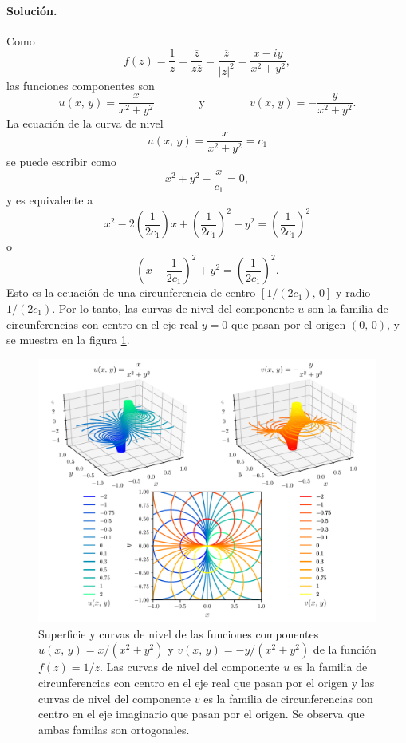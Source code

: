 \documentclass[a4paper]{report}
\begin{document}
\paragraph{Solución.} Como
\[
 f(z)=\frac{1}{z}=\frac{\overline{z}}{z\overline{z}}=\frac{\overline{z}}{|z|^2}=\frac{x-iy}{x^2+y^2},
\]
las funciones componentes son
\[
 u(x,\,y)=\frac{x}{x^2+y^2}
 \qquad\qquad\textrm{y}\qquad\qquad
 v(x,\,y)=-\frac{y}{x^2+y^2}.
\]
La ecuación de la curva de nivel 
\[
 u(x,\,y)=\frac{x}{x^2+y^2}=c_1
\]
se puede escribir como
\[
 x^2+y^2-\frac{x}{c_1}=0,
\]
y es equivalente a
\[
 x^2-2\left(\frac{1}{2c_1}\right)x+\left(\frac{1}{2c_1}\right)^2+y^2=\left(\frac{1}{2c_1}\right)^2
\]
o
\[
 \left(x-\frac{1}{2c_1}\right)^2+y^2=\left(\frac{1}{2c_1}\right)^2.
\]
Esto es la ecuación de una circunferencia de centro \([1/(2c_1),\,0]\) y radio \(1/(2c_1)\). Por lo tanto, las curvas de nivel del componente \(u\) son la familia de circunferencias con centro en el eje real \(y=0\) que pasan por el origen \((0,\,0)\), y se muestra en la figura \ref{fig:exercise_27_4}.
\begin{figure}[!htb]
 \begin{center}
 \includegraphics[width=\textwidth]{figuras/exercise_27_4.pdf}
 \caption{\label{fig:exercise_27_4} Superficie y curvas de nivel de las funciones componentes \(u(x,\,y)=x/(x^2+y^2)\) y \(v(x,\,y)=-y/(x^2+y^2)\) de la función \(f(z)=1/z\). Las curvas de nivel del componente \(u\) es la familia de circunferencias con centro en el eje real que pasan por el origen y las curvas de nivel del componente \(v\) es la familia de circunferencias con centro en el eje imaginario que pasan por el origen. Se observa que ambas familas son ortogonales.}
 \end{center}
\end{figure}
\end{document}
